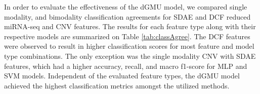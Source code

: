 In order to evaluate the effectiveness of the dGMU model, we compared single modality, and bimodality classification agreements for SDAE and DCF reduced miRNA-seq and CNV features. The results for each feature type along with their respective models are summarized on Table \ref{tab:classAgree}. The DCF features were observed to result in higher classification scores for most feature and model type combinations. The only exception was the single modality CNV with SDAE features, which had a higher accuracy, recall, and macro f1-score for MLP and SVM models. Independent of the evaluated feature types, the dGMU model achieved the highest classification metrics amongst the utilized methods.

\begin{table}[h!]
   \caption{Summary of classification agreement for CNV and miRNA-seq reduced to 500 features.} 
   \label{tab:classAgree}
   \centering %
\end{table}
